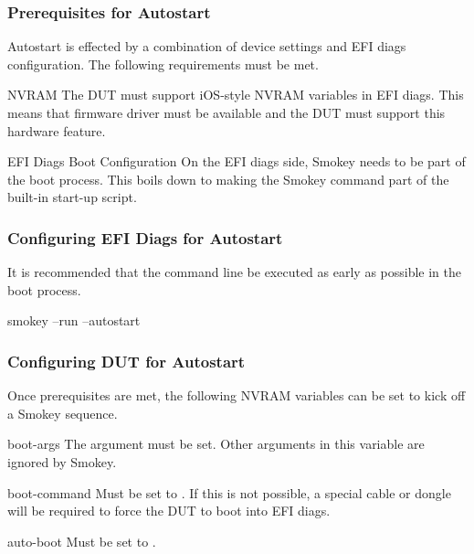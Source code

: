 \subsubsection{Prerequisites for Autostart}

Autostart is effected by a combination of device settings and EFI diags
configuration.  The following requirements must be met.

\begin{Definition}

\item[NVRAM] The DUT must support iOS-style NVRAM variables in EFI diags.  This
means that firmware driver must be available and the DUT must support this
hardware feature.

\item[EFI Diags Boot Configuration] On the EFI diags side, Smokey needs to be
part of the boot process.  This boils down to making the Smokey command part of
the built-in start-up script.  

\end{Definition}

\subsubsection{Configuring EFI Diags for Autostart}

It is recommended that the command line be executed as early as possible in the
boot process.

\begin{CommandLine}
smokey --run --autostart
\end{CommandLine}

\subsubsection{Configuring DUT for Autostart}

Once prerequisites are met, the following NVRAM variables can be set to kick
off a Smokey sequence.

\begin{Definition}

\item[boot-args] The  argument must be set.  Other arguments in
this variable are ignored by Smokey.

\item[boot-command] Must be set to .  If this is not possible, a
special cable or dongle will be required to force the DUT to boot into EFI
diags.

\item[auto-boot] Must be set to .

\end{Definition}

